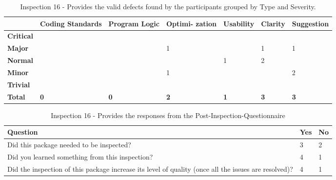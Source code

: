 \begin{table}[!h]
  \begin{center}
    \caption[Inspection 16 - Results by Type and Severity]{Inspection 16 -
      Provides the valid defects found by the participants grouped by Type
      and Severity.}
    \label{tab:inspection-results-16-type}
    \begin{tabular}{|p{2.0cm}|p{1.7cm}|p{1.5cm}|p{1.7cm}|p{1.4cm}|p{1.4cm}|p{1.5cm}|}  \hline   
\small{} & \small{}{\bf Coding Standards} & 
\small{}{\bf Program Logic} & \small{} {\bf Optimi- zation} & 
\small{}{\bf Usability} & \small{} {\bf Clarity} & 
\small{} {\bf Suggestion} \\ \hline

{\bf Critical} &   &   &   &   &   &   \\ \hline
{\bf Major}    &   &   & 1 &   & 1 & 1 \\ \hline
{\bf Normal}   &   &   &   & 1 & 2 &   \\ \hline
{\bf Minor}    &   &   & 1 &   &   & 2 \\ \hline
{\bf Trivial}  &   &   &   &   &   &   \\ \hline

{\bf Total} & {\bf 0} & {\bf 0} & {\bf 2} & {\bf 1} & {\bf 3} & {\bf 3} \\ \hline
    \end{tabular}
  \end{center}
\end{table}


\begin{table}[!h]
  \begin{center}
    \caption[Post Inspection 16 - Responses]{Inspection 16 - Provides the
      responses from the Post-Inspection-Questionnaire}
    \label{tab:post-inspection-questionnaire-results-16}
    \begin{tabular}{|p{8.0cm}|p{2.5cm}|p{2.5cm}|} \hline
{\bf Question} & {\bf Yes} & {\bf No} \\ \hline
Did this package needed to be inspected?  & 3 & 2 \\ \hline
Did you learned something from this inspection?  & 4 & 1 \\ \hline
Did the inspection of this package increase its level of quality (once all
the issues are resolved)? & 4 & 1 \\ \hline
    \end{tabular}
  \end{center}
\end{table}

